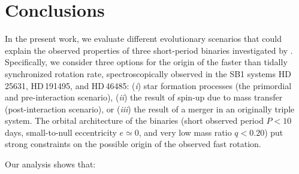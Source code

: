 \documentclass{aa}
\begin{document}
\section{Conclusions}
\label{sec:conclusions}
In the present work, we evaluate different evolutionary scenarios
that could explain the observed properties of three short-period
binaries investigated by \citet{Naze_2023_rot}. Specifically, we
  consider three options for the origin of the
  faster than tidally synchronized rotation rate, spectroscopically
  observed in the SB1 systems HD\,25631, HD\,191495, and HD\,46485: (\emph{i})
  star formation processes (the primordial and pre-interaction scenario), (\emph{ii})
  the result of spin-up due to mass transfer (post-interaction
  scenario), or (\emph{iii}) the result of a merger in an originally triple
  system. The orbital architecture of the binaries (short observed period $P<10$\,days,
  small-to-null eccentricity $e\simeq0$, and very low mass ratio $q<0.20$) put
  strong constraints on the possible origin of the observed fast rotation.

Our analysis shows that:
\end{document}
